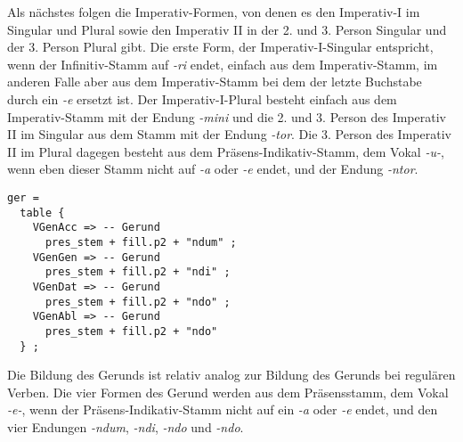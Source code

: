 Als nächstes folgen die Imperativ-Formen, von denen es den Imperativ-I im Singular und Plural sowie den Imperativ II in der 2. und 3. Person Singular und der 3. Person Plural gibt. Die erste Form, der Imperativ-I-Singular entspricht, wenn der Infinitiv-Stamm auf \textit{-ri} endet, einfach aus dem Imperativ-Stamm, im anderen Falle aber aus dem Imperativ-Stamm bei dem der letzte Buchstabe durch ein \textit{-e} ersetzt ist. Der Imperativ-I-Plural besteht einfach aus dem Imperativ-Stamm mit der Endung \textit{-mini} und die 2. und 3. Person des Imperativ II im Singular aus dem Stamm mit der Endung \textit{-tor}. Die 3. Person des Imperativ II im Plural dagegen besteht aus dem Präsens-Indikativ-Stamm, dem Vokal \textit{-u-}, wenn eben dieser Stamm nicht auf \textit{-a} oder \textit{-e} endet, und der Endung \textit{-ntor}. \par
\begin{lstlisting}[float=h!tp,caption={Ausschnitt aus der Funktion \texttt{mkDeponent} um Gerund-Verbformen zu bilden (vgl. \textbf{ResLat.gf})},label={GF-Res-MkDeponent-Ger},basicstyle=\small]
ger = 
  table {
    VGenAcc => -- Gerund
      pres_stem + fill.p2 + "ndum" ;
    VGenGen => -- Gerund
      pres_stem + fill.p2 + "ndi" ;
    VGenDat => -- Gerund
      pres_stem + fill.p2 + "ndo" ;
    VGenAbl => -- Gerund
      pres_stem + fill.p2 + "ndo" 
  } ;
\end{lstlisting}
Die Bildung des Gerunds ist relativ analog zur Bildung des Gerunds bei regulären Verben. Die vier Formen des Gerund werden aus dem Präsensstamm, dem Vokal \textit{-e-}, wenn der Präsens-Indikativ-Stamm nicht auf ein \textit{-a} oder \textit{-e} endet, und den vier Endungen \textit{-ndum}, \textit{-ndi}, \textit{-ndo} und \textit{-ndo}. \par
